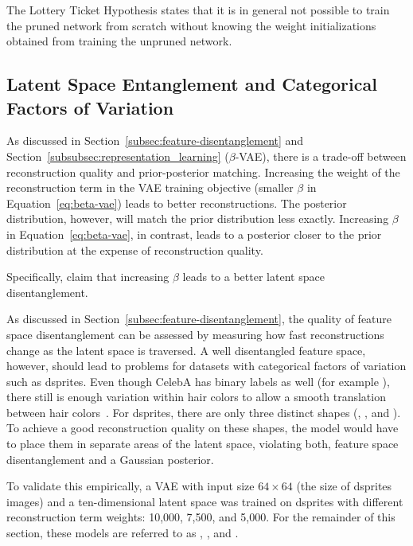 The Lottery Ticket Hypothesis states that it is in general not possible to train the pruned network from scratch without knowing the weight initializations obtained from training the unpruned network.

\subsection{Latent Space Entanglement and Categorical Factors of Variation}\label{subsec:latent-space-entanglement-and-categorical-factors-of-variation}

As discussed in Section~\ref{subsec:feature-disentanglement} and Section~\ref{subsubsec:representation_learning} ($\beta$-\ac{VAE}), there is a trade-off between reconstruction quality and prior-posterior matching.
Increasing the weight of the reconstruction term in the \ac{VAE} training objective (smaller $\beta$ in Equation~\ref{eq:beta-vae}) leads to better reconstructions.
The posterior distribution, however, will match the prior distribution less exactly.
Increasing $\beta$ in Equation~\ref{eq:beta-vae}, in contrast, leads to a posterior closer to the prior distribution at the expense of reconstruction quality.

Specifically, \citet{higgins2017beta} claim that increasing $\beta$ leads to a better latent space disentanglement.

As discussed in Section~\ref{subsec:feature-disentanglement}, the quality of feature space disentanglement can be assessed by measuring how fast reconstructions change as the latent space is traversed.
A well disentangled feature space, however, should lead to problems for datasets with categorical factors of variation such as dsprites.
Even though CelebA has binary labels as well (for example ), there still is enough variation within hair colors to allow a smooth translation between hair colors~\citep{higgins2017beta}.
For dsprites, there are only three distinct shapes (, , and ).
To achieve a good reconstruction quality on these shapes, the model would have to place them in separate areas of the latent space, violating both, feature space disentanglement and a Gaussian posterior.

To validate this empirically, a \ac{VAE} with input size $64\times 64$ (the size of dsprites images) and a ten-dimensional latent space was trained on dsprites with different reconstruction term weights: 10,000, 7,500, and 5,000.
For the remainder of this section, these models are referred to as , , and .

